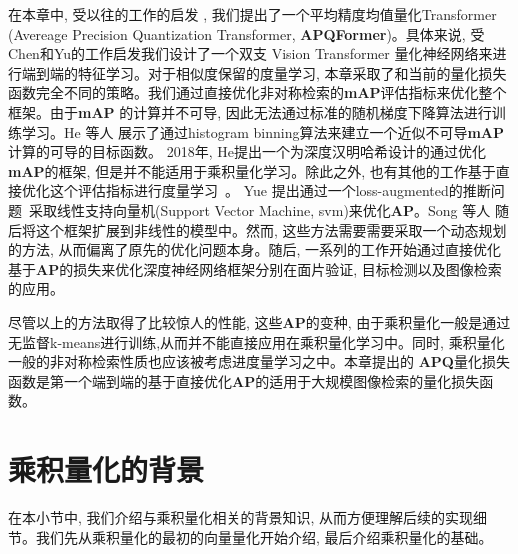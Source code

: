 在本章中, 受以往的工作的启发 \cite{chen2021crossvit,cakir2019deep,revaud2019learning}, 我们提出了一个平均精度均值量化Transformer (Avereage Precision Quantization Transformer, \textbf{APQFormer})。具体来说, 受Chen和Yu的工作启发\cite{chen2021crossvit,yu2018product}我们设计了一个双支 Vision Transformer 量化神经网络来进行端到端的特征学习。对于相似度保留的度量学习, 本章采取了和当前的量化损失函数完全不同的策略。我们通过直接优化非对称检索的\textbf{mAP}评估指标来优化整个框架。由于\textbf{mAP} 的计算并不可导, 因此无法通过标准的随机梯度下降算法进行训练学习。He 等人\cite{he2018hashing,he2018local} 展示了通过histogram binning算法\cite{ustinova2016learning}来建立一个近似不可导\textbf{mAP}计算的可导的目标函数。 2018年, He\cite{he2018hashing}提出一个为深度汉明哈希设计的通过优化\textbf{mAP}的框架, 但是并不能适用于乘积量化学习。除此之外, 也有其他的工作基于直接优化这个评估指标进行度量学习~\cite{yue2007support,mcallester2010direct,oh2016deep,henderson2016end}。 Yue 提出通过一个loss-augmented的推断问题~\cite{mcallester2010direct}采取线性支持向量机(Support Vector Machine, svm)来优化\textbf{AP}。Song 等人\cite{song2016training} 随后将这个框架扩展到非线性的模型中。然而, 这些方法需要需要采取一个动态规划的方法, 从而偏离了原先的优化问题本身。随后, 一系列的工作开始\cite{he2018local,henderson2016end,revaud2019learning}通过直接优化基于\textbf{AP}的损失来优化深度神经网络框架分别在面片验证, 目标检测以及图像检索的应用。\par
尽管以上的方法取得了比较惊人的性能, 这些\textbf{AP}的变种, 由于乘积量化一般是通过无监督k-means进行训练,从而并不能直接应用在乘积量化学习中。同时, 乘积量化一般的非对称检索性质也应该被考虑进度量学习之中。本章提出的 \textbf{APQ}量化损失函数是第一个端到端的基于直接优化\textbf{AP}的适用于大规模图像检索的量化损失函数。 
\section{乘积量化的背景}
在本小节中, 我们介绍与乘积量化相关的背景知识, 从而方便理解后续的实现细节。我们先从乘积量化的最初的向量量化开始介绍, 最后介绍乘积量化的基础。

